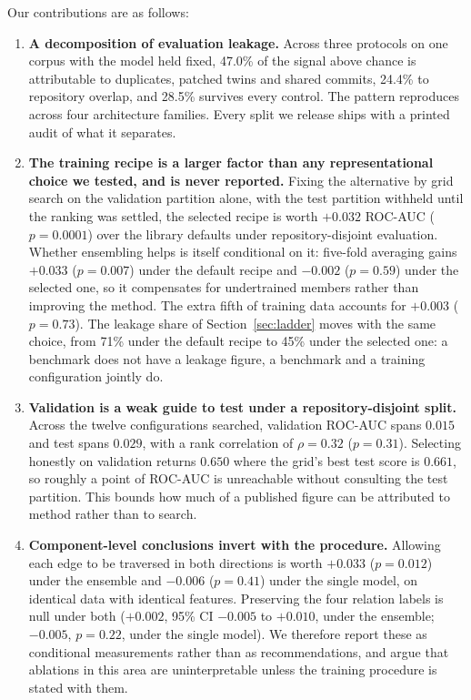 Our contributions are as follows:
\begin{enumerate}
    \item \textbf{A decomposition of evaluation leakage.} Across three
    protocols on one corpus with the model held fixed, 47.0\% of the signal
    above chance is attributable to duplicates, patched twins and shared
    commits, 24.4\% to repository overlap, and 28.5\% survives every control.
    The pattern reproduces across four architecture families. Every split we
    release ships with a printed audit of what it separates.

    \item \textbf{The training recipe is a larger factor than any
    representational choice we tested, and is never reported.} Fixing the
    alternative by grid search on the validation partition alone, with the test
    partition withheld until the ranking was settled, the selected recipe is
    worth $+0.032$ ROC-AUC ($p=0.0001$) over the library defaults under
    repository-disjoint evaluation. Whether ensembling helps is itself
    conditional on it: five-fold averaging gains $+0.033$ ($p=0.007$) under the
    default recipe and $-0.002$ ($p=0.59$) under the selected one, so it
    compensates for undertrained members rather than improving the method. The
    extra fifth of training data accounts for $+0.003$ ($p=0.73$). The leakage
    share of Section~\ref{sec:ladder} moves with the same choice, from 71\%
    under the default recipe to 45\% under the selected one: a benchmark does
    not have a leakage figure, a benchmark and a training configuration jointly
    do.

    \item \textbf{Validation is a weak guide to test under a
    repository-disjoint split.} Across the twelve configurations searched,
    validation ROC-AUC spans $0.015$ and test spans $0.029$, with a rank
    correlation of $\rho=0.32$ ($p=0.31$). Selecting honestly on validation
    returns $0.650$ where the grid's best test score is $0.661$, so roughly a
    point of ROC-AUC is unreachable without consulting the test partition. This
    bounds how much of a published figure can be attributed to method rather
    than to search.

    \item \textbf{Component-level conclusions invert with the procedure.}
    Allowing each edge to be traversed in both directions is worth $+0.033$
    ($p=0.012$) under the ensemble and $-0.006$ ($p=0.41$) under the single
    model, on identical data with identical features. Preserving the four
    relation labels is null under both ($+0.002$, 95\% CI $-0.005$ to $+0.010$,
    under the ensemble; $-0.005$, $p=0.22$, under the single model). We therefore report these as
    conditional measurements rather than as recommendations, and argue that
    ablations in this area are uninterpretable unless the training procedure is
    stated with them.


\end{enumerate}
